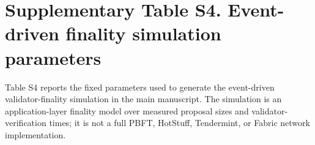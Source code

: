 \documentclass[12pt]{article}
\begin{document}
\begin{table}[h]
\centering
\caption*{S3. Validator-dropout liveness boundary.}
\end{table}

\clearpage
\section*{Supplementary Table S4. Event-driven finality simulation parameters}

Table S4 reports the fixed parameters used to generate the event-driven validator-finality simulation in the main manuscript. The simulation is an application-layer finality model over measured proposal sizes and validator-verification times; it is not a full PBFT, HotStuff, Tendermint, or Fabric network implementation.
\end{document}
